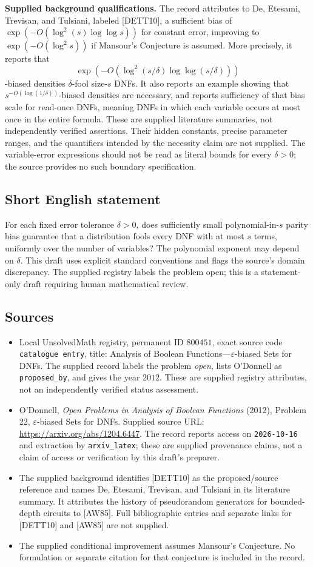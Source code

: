 \documentclass[11pt]{article}
\begin{document}
\textbf{Supplied background qualifications.} The record attributes to De, Etesami, Trevisan, and Tulsiani, labeled [DETT10], a sufficient bias of
\(\exp(-O(\log^2(s)\log\log s))\) for constant error, improving to \(\exp(-O(\log^2 s))\) if Mansour's Conjecture is assumed. More precisely, it reports that
\[
\exp\!\left(-O\!\left(\log^2(s/\delta)\log\log(s/\delta)\right)\right)
\]
-biased densities \(\delta\)-fool size-\(s\) DNFs. It also reports an example showing that \(s^{-O(\log(1/\delta))}\)-biased densities are necessary, and reports sufficiency of that bias scale for read-once DNFs, meaning DNFs in which each variable occurs at most once in the entire formula. These are supplied literature summaries, not independently verified assertions. Their hidden constants, precise parameter ranges, and the quantifiers intended by the necessity claim are not supplied. The variable-error expressions should not be read as literal bounds for every \(\delta>0\); the source provides no such boundary specification.
\subsection{Short English statement}
For each fixed error tolerance \(\delta>0\), does sufficiently small polynomial-in-\(s\) parity bias guarantee that a distribution fools every DNF with at most \(s\) terms, uniformly over the number of variables? The polynomial exponent may depend on \(\delta\). This draft uses explicit standard conventions and flags the source's domain discrepancy. The supplied registry labels the problem open; this is a statement-only draft requiring human mathematical review.
\subsection{Sources}
\begin{itemize}
\item Local UnsolvedMath registry, permanent ID \(800451\), exact source code \texttt{catalogue entry}, title: Analysis of Boolean Functions---\(\varepsilon\)-biased Sets for DNFs. The supplied record labels the problem \emph{open}, lists O'Donnell as \texttt{proposed\_by}, and gives the year \(2012\). These are supplied registry attributes, not an independently verified status assessment.
\item O'Donnell, \emph{Open Problems in Analysis of Boolean Functions} (2012), Problem 22, \(\varepsilon\)-biased Sets for DNFs. Supplied source URL: \url{https://arxiv.org/abs/1204.6447}. The record reports access on \texttt{2026-10-16} and extraction by \texttt{arxiv\_latex}; these are supplied provenance claims, not a claim of access or verification by this draft's preparer.
\item The supplied background identifies [DETT10] as the proposed/source reference and names De, Etesami, Trevisan, and Tulsiani in its literature summary. It attributes the history of pseudorandom generators for bounded-depth circuits to [AW85]. Full bibliographic entries and separate links for [DETT10] and [AW85] are not supplied.
\item The supplied conditional improvement assumes Mansour's Conjecture. No formulation or separate citation for that conjecture is included in the record.
\end{itemize}
\end{document}
